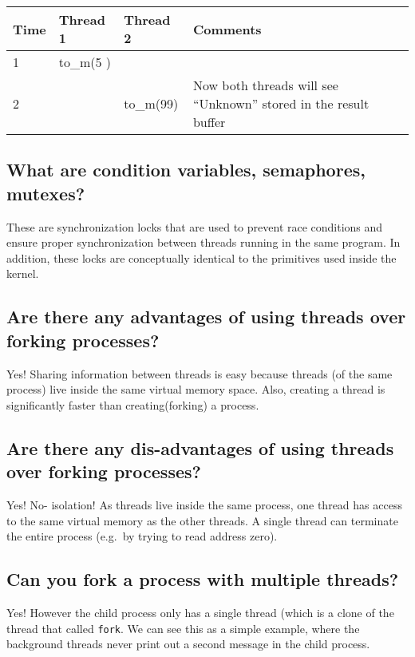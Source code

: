 \begin{longtable}[c]{@{}llll@{}}
\toprule
Time & Thread 1 & Thread 2 & Comments\tabularnewline
\midrule
\endhead
1 & to\_m(5 ) &\tabularnewline
2 & & to\_m(99) & Now both threads will see ``Unknown'' stored in the
result buffer\tabularnewline
\bottomrule
\end{longtable}

\subsection{What are condition variables, semaphores,
mutexes?}\label{what-are-condition-variables-semaphores-mutexes}

These are synchronization locks that are used to prevent race conditions
and ensure proper synchronization between threads running in the same
program. In addition, these locks are conceptually identical to the
primitives used inside the kernel.

\subsection{Are there any advantages of using threads over forking
processes?}\label{are-there-any-advantages-of-using-threads-over-forking-processes}

Yes! Sharing information between threads is easy because threads (of the
same process) live inside the same virtual memory space. Also, creating
a thread is significantly faster than creating(forking) a process.

\subsection{Are there any dis-advantages of using threads over forking
processes?}\label{are-there-any-dis-advantages-of-using-threads-over-forking-processes}

Yes! No- isolation! As threads live inside the same process, one thread
has access to the same virtual memory as the other threads. A single
thread can terminate the entire process (e.g.~by trying to read address
zero).

\subsection{Can you fork a process with multiple
threads?}\label{can-you-fork-a-process-with-multiple-threads}

Yes! However the child process only has a single thread (which is a
clone of the thread that called \texttt{fork}. We can see this as a
simple example, where the background threads never print out a second
message in the child process.


